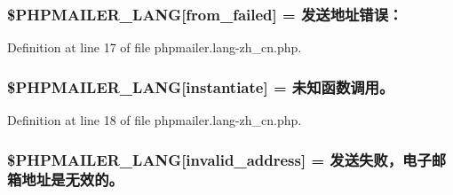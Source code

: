 \subsubsection[{\texorpdfstring{\$\+P\+H\+P\+M\+A\+I\+L\+E\+R\+\_\+\+L\+A\+NG}{$PHPMAILER_LANG}}]{\setlength{\rightskip}{0pt plus 5cm}\$P\+H\+P\+M\+A\+I\+L\+E\+R\+\_\+\+L\+A\+NG\mbox{[}\textquotesingle{}from\+\_\+failed\textquotesingle{}\mbox{]} = \textquotesingle{}发送地址错误：\textquotesingle{}}\hypertarget{phpmailer_8lang-zh__cn_8php_adf832ae12155a09be077c6d5e4fd7e22}{}\label{phpmailer_8lang-zh__cn_8php_adf832ae12155a09be077c6d5e4fd7e22}


Definition at line 17 of file phpmailer.\+lang-\/zh\+\_\+cn.\+php.

\subsubsection[{\texorpdfstring{\$\+P\+H\+P\+M\+A\+I\+L\+E\+R\+\_\+\+L\+A\+NG}{$PHPMAILER_LANG}}]{\setlength{\rightskip}{0pt plus 5cm}\$P\+H\+P\+M\+A\+I\+L\+E\+R\+\_\+\+L\+A\+NG\mbox{[}\textquotesingle{}instantiate\textquotesingle{}\mbox{]} = \textquotesingle{}未知函数调用。\textquotesingle{}}\hypertarget{phpmailer_8lang-zh__cn_8php_ad58dde16780f4770ccf4dd282ea1f5ad}{}\label{phpmailer_8lang-zh__cn_8php_ad58dde16780f4770ccf4dd282ea1f5ad}


Definition at line 18 of file phpmailer.\+lang-\/zh\+\_\+cn.\+php.

\subsubsection[{\texorpdfstring{\$\+P\+H\+P\+M\+A\+I\+L\+E\+R\+\_\+\+L\+A\+NG}{$PHPMAILER_LANG}}]{\setlength{\rightskip}{0pt plus 5cm}\$P\+H\+P\+M\+A\+I\+L\+E\+R\+\_\+\+L\+A\+NG\mbox{[}\textquotesingle{}invalid\+\_\+address\textquotesingle{}\mbox{]} = \textquotesingle{}发送失败，电子邮箱地址是无效的。\textquotesingle{}}\hypertarget{phpmailer_8lang-zh__cn_8php_a42d61bcea4c79599ecb44fd062f54d47}{}\label{phpmailer_8lang-zh__cn_8php_a42d61bcea4c79599ecb44fd062f54d47}


